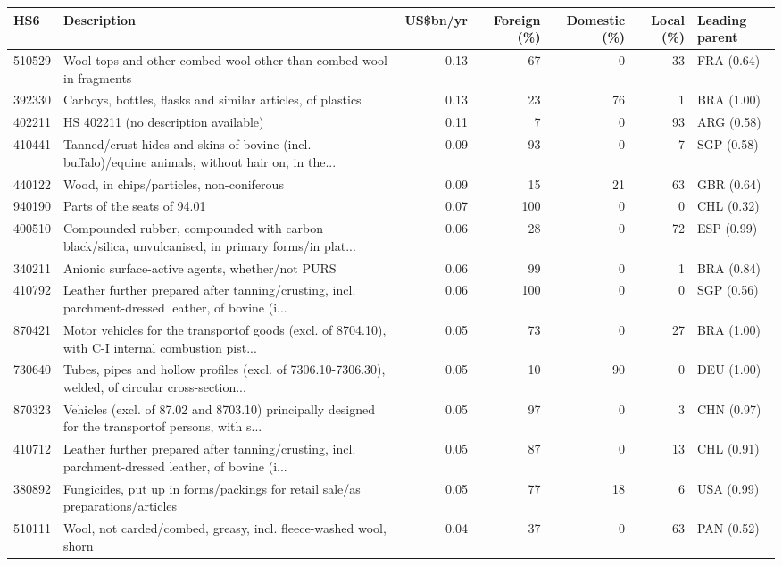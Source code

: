 \begin{tabular}{@{}l p{6.4cm} r r r r l@{}}
\toprule
HS6 & Description & US\$bn/yr & Foreign (\%) & Domestic (\%) & Local (\%) & Leading parent \\
\midrule
510529 & Wool tops and other combed wool other than combed wool in fragments & 0.13 & 67 & 0 & 33 & FRA (0.64) \\
392330 & Carboys, bottles, flasks and similar articles, of plastics & 0.13 & 23 & 76 & 1 & BRA (1.00) \\
402211 & HS 402211 (no description available) & 0.11 & 7 & 0 & 93 & ARG (0.58) \\
410441 & Tanned/\allowbreak{}crust hides and skins of bovine (incl. buffalo)/\allowbreak{}equine animals, without hair on, in the... & 0.09 & 93 & 0 & 7 & SGP (0.58) \\
440122 & Wood, in chips/\allowbreak{}particles, non-coniferous & 0.09 & 15 & 21 & 63 & GBR (0.64) \\
940190 & Parts of the seats of 94.01 & 0.07 & 100 & 0 & 0 & CHL (0.32) \\
400510 & Compounded rubber, compounded with carbon black/\allowbreak{}silica, unvulcanised, in primary forms/\allowbreak{}in plat... & 0.06 & 28 & 0 & 72 & ESP (0.99) \\
340211 & Anionic surface-active agents, whether/\allowbreak{}not PURS & 0.06 & 99 & 0 & 1 & BRA (0.84) \\
410792 & Leather further prepared after tanning/\allowbreak{}crusting, incl. parchment-dressed leather, of bovine (i... & 0.06 & 100 & 0 & 0 & SGP (0.56) \\
870421 & Motor vehicles for the transportof goods (excl. of 8704.10), with C-I internal combustion pist... & 0.05 & 73 & 0 & 27 & BRA (1.00) \\
730640 & Tubes, pipes and hollow profiles (excl. of 7306.10-7306.30), welded, of circular cross-section... & 0.05 & 10 & 90 & 0 & DEU (1.00) \\
870323 & Vehicles (excl. of 87.02 and 8703.10) principally designed for the transportof persons, with s... & 0.05 & 97 & 0 & 3 & CHN (0.97) \\
410712 & Leather further prepared after tanning/\allowbreak{}crusting, incl. parchment-dressed leather, of bovine (i... & 0.05 & 87 & 0 & 13 & CHL (0.91) \\
380892 & Fungicides, put up in forms/\allowbreak{}packings for retail sale/\allowbreak{}as preparations/\allowbreak{}articles  & 0.05 & 77 & 18 & 6 & USA (0.99) \\
510111 & Wool, not carded/\allowbreak{}combed, greasy, incl. fleece-washed wool, shorn & 0.04 & 37 & 0 & 63 & PAN (0.52) \\
\bottomrule
\end{tabular}
